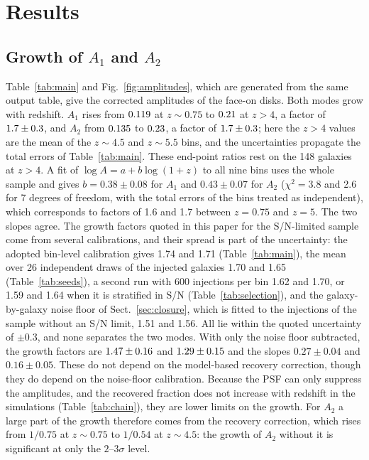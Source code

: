 \documentclass[fleqn,usenatbib]{mnras}
\begin{document}
\section{Results}\label{sec:results}

\subsection{Growth of $A_1$ and $A_2$}\label{sec:growth}

Table~\ref{tab:main} and Fig.~\ref{fig:amplitudes}, which are generated from
the same output table, give the corrected amplitudes of the face-on disks. Both
modes grow with redshift. $A_1$ rises from $0.119$ at $z\sim0.75$ to
$0.21$ at $z>4$, a factor of $1.7\pm0.3$, and $A_2$ from
$0.135$ to $0.23$, a factor of $1.7\pm0.3$; here the
$z>4$ values are the mean of the $z\sim4.5$ and $z\sim5.5$ bins, and the
uncertainties propagate the total errors of Table~\ref{tab:main}. These
end-point ratios rest on the 148 galaxies at $z>4$. A fit of
$\log A=a+b\log(1+z)$ to all nine bins uses the whole sample and gives
$b=0.38\pm0.08$ for $A_1$ and $0.43\pm0.07$ for $A_2$ ($\chi^2=3.8$ and 2.6 for
7 degrees of freedom, with the total errors of the bins treated as independent),
which corresponds to factors of 1.6 and 1.7 between $z=0.75$ and $z=5$. The two
slopes agree. The growth factors quoted in this paper for the S/N-limited sample
come from several calibrations, and their spread is part of the uncertainty: the
adopted bin-level calibration gives 1.74 and 1.71 (Table~\ref{tab:main}), the
mean over 26 independent draws of the injected galaxies 1.70 and 1.65
(Table~\ref{tab:seeds}), a second run with 600 injections per bin 1.62 and 1.70,
or 1.59 and 1.64 when it is stratified in S/N (Table~\ref{tab:selection}), and
the galaxy-by-galaxy noise floor of Sect.~\ref{sec:closure}, which is fitted to
the injections of the sample without an S/N limit, 1.51 and 1.56. All lie within
the quoted uncertainty of $\pm0.3$, and none separates the two modes. With only the noise floor subtracted, the growth factors are
$1.47\pm0.16$ and $1.29\pm0.15$ and the slopes
$0.27\pm0.04$ and $0.16\pm0.05$. These do not depend on the model-based recovery
correction, though they do depend on the noise-floor calibration. Because the PSF
can only suppress the amplitudes, and the recovered fraction does not increase
with redshift in the simulations (Table~\ref{tab:chain}), they are lower limits
on the growth. For $A_2$ a large part of the growth therefore comes from the
recovery correction, which rises from $1/0.75$ at $z\sim0.75$ to $1/0.54$ at
$z\sim4.5$: the growth of $A_2$ without it is significant at only the
$2$--$3\sigma$ level.
\end{document}

